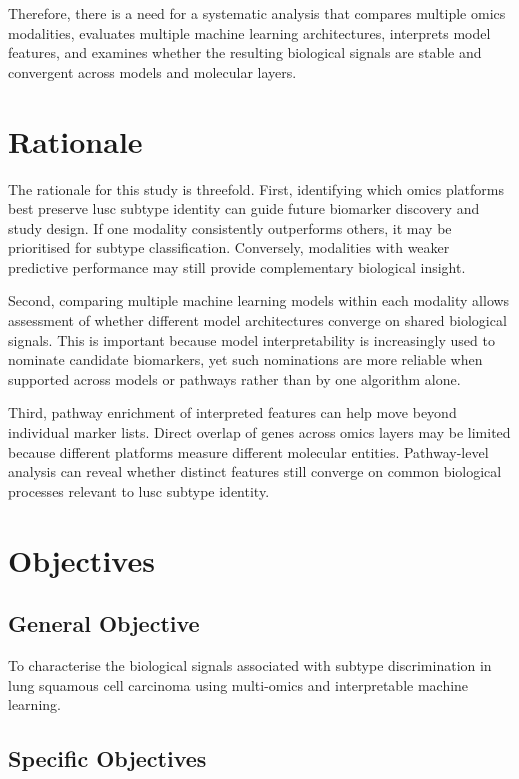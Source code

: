 Therefore, there is a need for a systematic analysis that compares multiple omics modalities, evaluates multiple machine learning architectures, interprets model features, and examines whether the resulting biological signals are stable and convergent across models and molecular layers.

\section{Rationale}

The rationale for this study is threefold. First, identifying which omics platforms best preserve \gls{lusc} subtype identity can guide future biomarker discovery and study design. If one modality consistently outperforms others, it may be prioritised for subtype classification. Conversely, modalities with weaker predictive performance may still provide complementary biological insight.

Second, comparing multiple machine learning models within each modality allows assessment of whether different model architectures converge on shared biological signals. This is important because model interpretability is increasingly used to nominate candidate biomarkers, yet such nominations are more reliable when supported across models or pathways rather than by one algorithm alone.

Third, pathway enrichment of interpreted features can help move beyond individual marker lists. Direct overlap of genes across omics layers may be limited because different platforms measure different molecular entities. Pathway-level analysis can reveal whether distinct features still converge on common biological processes relevant to \gls{lusc} subtype identity.

\section{Objectives}

\subsection{General Objective}
To characterise the biological signals associated with subtype discrimination in lung squamous cell carcinoma using multi-omics and interpretable machine learning.


\subsection{Specific Objectives}

